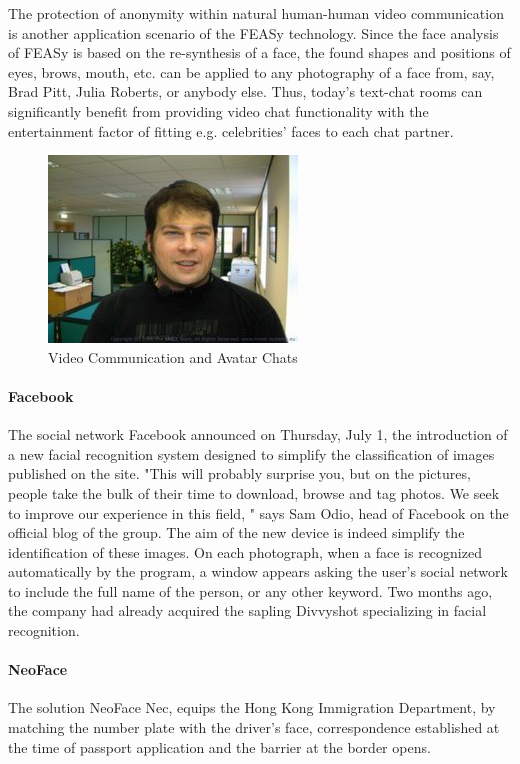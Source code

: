 The protection of anonymity within natural human-human video communication is another application scenario of the FEASy technology. Since the face analysis of FEASy is based on the re-synthesis of a face, the found shapes and positions of eyes, brows, mouth, etc. can be applied to any photography of a face from, say, Brad Pitt, Julia Roberts, or anybody else. Thus, today's text-chat rooms can significantly benefit from providing video chat functionality with the entertainment factor of fitting e.g. celebrities' faces to each chat partner.
\begin{figure}[htpb]
	\includegraphics[width=.6\linewidth]{img/avatarchat}
		\caption{Video Communication and Avatar Chats}
\end{figure}

\paragraph*{Facebook}
The social network Facebook announced on Thursday, July 1, the introduction of a new facial recognition system designed to simplify the classification of images published on the site.
"This will probably surprise you, but on the pictures, people take the bulk of their time to download, browse and tag photos. We seek to improve our experience in this field, " says Sam Odio, head of Facebook on the official blog of the group.
The aim of the new device is indeed simplify the identification of these images. On each photograph, when a face is recognized automatically by the program, a window appears asking the user's social network to include the full name of the person, or any other keyword. Two months ago, the company had already acquired the sapling Divvyshot specializing in facial recognition.
\cite{facebook}

\paragraph*{NeoFace}
The solution NeoFace Nec, equips the Hong Kong Immigration Department, by matching the number plate with the driver's face, correspondence established at the time of passport application and the barrier at the border opens.

